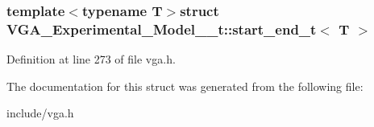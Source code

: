 \subsubsection*{template$<$typename T$>$struct V\-G\-A\-\_\-\-Experimental\-\_\-\-Model\-\_\-\_\-t\-::start\-\_\-end\-\_\-t$<$ T $>$}



Definition at line 273 of file vga.\-h.



The documentation for this struct was generated from the following file\-:\begin{DoxyCompactItemize}
\item 
include/vga.\-h\end{DoxyCompactItemize}
